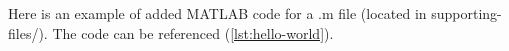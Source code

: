 
Here is an example of added MATLAB code for a .m file (located in supporting-files/). The code can be referenced (\ref{lst:hello-world}).

